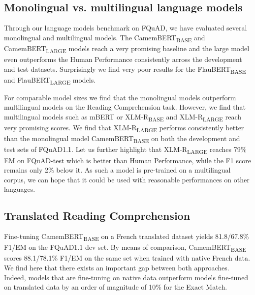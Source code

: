 \documentclass{article}
\begin{document}
\subsection{Monolingual vs. multilingual language models}

Through our language models benchmark on FQuAD, we have evaluated several monolingual and multilingual models.
The CamemBERT\textsubscript{BASE} and CamemBERT\textsubscript{LARGE} models reach a very promising baseline and the large model even outperforms the Human Performance consistently across the development and test datasets.
Surprisingly we find very poor results for the FlauBERT\textsubscript{BASE} and FlauBERT\textsubscript{LARGE} models.


For comparable model sizes we find that the monolingual models outperform multilingual models on the Reading Comprehension task.
However, we find that multilingual models such as mBERT \citep{multilingual-bert} or XLM-R\textsubscript{BASE} and XLM-R\textsubscript{LARGE} \citep{xlmr} reach very promising scores.
We find that XLM-R\textsubscript{LARGE} performs consistently better than the monolingual model CamemBERT\textsubscript{BASE} on both the development and test sets of FQuAD1.1.
Let us further highlight that XLM-R\textsubscript{LARGE} reaches 79\% EM on FQuAD-test which is better than Human Performance, while the F1 score remains only 2\% below it.
As such a model is pre-trained on a multilingual corpus, we can hope that it could be used with reasonable performances on other languages. 

\subsection{Translated Reading Comprehension}

Fine-tuning CamemBERT\textsubscript{BASE} on a French translated dataset yields 81.8/67.8\% F1/EM on the FQuAD1.1 dev set.
By means of comparison, CamemBERT\textsubscript{BASE} scores 88.1/78.1\% F1/EM on the same set when trained with native French data.
We find here that there exists an important gap between both approaches.
Indeed, models that are fine-tuning on native data outperform models fine-tuned on translated data by an order of magnitude of 10\% for the Exact Match.
\end{document}
